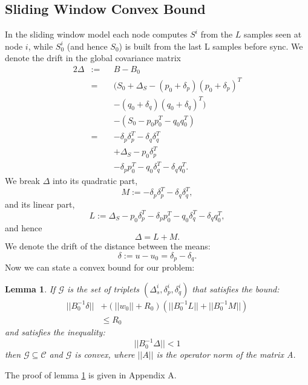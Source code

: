 \documentclass{sig-alternate-05-2015}
\newtheorem{lemma}{Lemma}
\begin{document}
\subsection{Sliding Window Convex Bound}
In the sliding window model each node computes $S^i$ from the $L$ samples seen
at node $i$, while $S_0^i$ (and hence $S_0$) is built from the last L samples before
sync. 
We denote the drift in the global covariance matrix
\begin{alignat*}{2}
\Delta & := && B-B_0 \\
& = && (S_0+\Delta_S - (p_0+\delta_p)(p_0+\delta_p)^T \\
& && - (q_0+\delta_q)(q_0+\delta_q)^T) \\
& && - (S_0 - p_0p_0^T - q_0q_0^T) \\
& = && - \delta_p\delta_p^T - \delta_q\delta_q^T \\
& && + \Delta_S - p_0\delta_p^T \\
& && - \delta_pp_0^T - q_0\delta_q^T - \delta_qq_0^T.
\end{alignat*}
We break $\Delta$ into its quadratic part,
\begin{equation*}
M:= - \delta_p\delta_p^T - \delta_q\delta_q^T, 
\end{equation*}
and its linear part,
\begin{equation*}
L:= \Delta_S - p_0\delta_p^T - \delta_pp_0^T - q_0\delta_q^T - \delta_qq_0^T, 
\end{equation*}
and hence 
\begin{equation*}
\Delta= L+ M.
\end{equation*}
We denote the drift of the distance between the means:
\begin{equation*}
\delta:= u-u_0 = \delta_p - \delta_q.
\end{equation*}
Now we can state a convex bound for our problem:
\begin{lemma} \label{convexBound}
If $\mathcal{G}$ is the set of triplets $(\Delta_s^i, \delta_p^i, \delta_q^i)$
 that satisfies the bound:
 \begin{equation} \label{eq:convexBound}
\begin{split}
||B_0^{-1}\delta|| &+ (||w_0||+R_0)(||B_0^{-1}L||+||B_0^{-1}M||) \\ & \leq  R_0
\end{split}
\end{equation}
and satisfies the inequality:
 \begin{equation*} 
||B_0^{-1}\Delta|| < 1
\end{equation*}
 then $\mathcal{G}
 \subseteq \mathcal{C}$ and $\mathcal{G}$ is convex, where $||A||$ is the
 operator norm of the matrix A.
\end{lemma}
The proof of lemma \ref{convexBound} is given in Appendix A.
\end{document}
